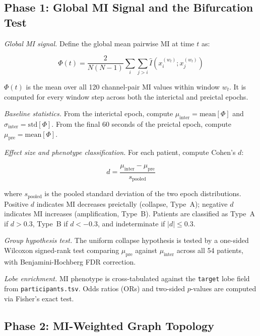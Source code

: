 \documentclass[final,5p,times,twocolumn]{elsarticle}
\begin{document}
\subsection{Phase 1: Global MI Signal and the Bifurcation Test}
\label{sec:phase1}

\textit{Global MI signal.}
Define the global mean pairwise MI at time $t$ as:

\begin{equation}
  \Phi(t) = \frac{2}{N(N-1)}
            \sum_{i} \sum_{j > i}
            \hat{I}\!\left(x_i^{(w_t)}; x_j^{(w_t)}\right)
  \label{eq:phi}
\end{equation}

$\Phi(t)$ is the mean over all 120 channel-pair MI values within window
$w_t$.
%
It is computed for every window step across both the interictal and
preictal epochs.

\textit{Baseline statistics.}
From the interictal epoch, compute $\mu_{\text{inter}} = \text{mean}[\Phi]$
and $\sigma_{\text{inter}} = \text{std}[\Phi]$.
%
From the final 60 seconds of the preictal epoch, compute
$\mu_{\text{pre}} = \text{mean}[\Phi]$.

\textit{Effect size and phenotype classification.}
For each patient, compute Cohen's $d$:

\begin{equation}
  d = \frac{\mu_{\text{inter}} - \mu_{\text{pre}}}{s_{\text{pooled}}}
  \label{eq:cohend}
\end{equation}

where $s_{\text{pooled}}$ is the pooled standard deviation of the two
epoch distributions.
%
Positive $d$ indicates MI decreases preictally (collapse, Type~A);
negative $d$ indicates MI increases (amplification, Type~B).
%
Patients are classified as Type~A if $d > 0.3$, Type~B if $d < -0.3$,
and indeterminate if $|d| \leq 0.3$.

\textit{Group hypothesis test.}
The uniform collapse hypothesis is tested by a one-sided Wilcoxon
signed-rank test comparing $\mu_{\text{pre}}$ against $\mu_{\text{inter}}$
across all 54 patients, with Benjamini-Hochberg FDR correction.

\textit{Lobe enrichment.}
MI phenotype is cross-tabulated against the \texttt{target} lobe field
from \texttt{participants.tsv}.
%
Odds ratios (ORs) and two-sided $p$-values are computed via Fisher's
exact test.

\subsection{Phase 2: MI-Weighted Graph Topology}
\label{sec:phase2}
\end{document}
